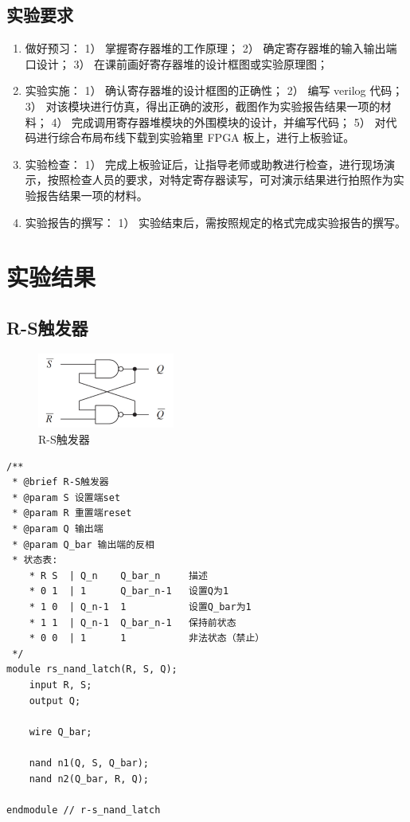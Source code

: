 \documentclass[AutoFakeBold]{LZUThesis}
\begin{document}
\section{实验要求}
\begin{enumerate}
    \item 做好预习：
    1） 掌握寄存器堆的工作原理；
    2） 确定寄存器堆的输入输出端口设计；
    3） 在课前画好寄存器堆的设计框图或实验原理图；
    \item 实验实施：
    1） 确认寄存器堆的设计框图的正确性；
    2） 编写 verilog 代码；
    3） 对该模块进行仿真，得出正确的波形，截图作为实验报告结果一项的材料；
    4） 完成调用寄存器堆模块的外围模块的设计，并编写代码；
    5） 对代码进行综合布局布线下载到实验箱里 FPGA 板上，进行上板验证。
    \item 实验检查：
    1） 完成上板验证后，让指导老师或助教进行检查，进行现场演示，按照检查人员的要求，对特定寄存器读写，可对演示结果进行拍照作为实验报告结果一项的材料。
    \item 实验报告的撰写：
    1） 实验结束后，需按照规定的格式完成实验报告的撰写。
\end{enumerate}

\chapter{实验结果}
\section{R-S触发器}
\begin{figure}[htbp]
    \centering
    \includegraphics[width=0.4\textwidth]{img/RS_latch}
    \caption{R-S触发器}
\end{figure}

\begin{lstlisting}[style={verilog-style}]
/**
 * @brief R-S触发器
 * @param S 设置端set
 * @param R 重置端reset
 * @param Q 输出端
 * @param Q_bar 输出端的反相
 * 状态表:
    * R	S  | Q_n	Q_bar_n	    描述
    * 0	1  | 1	    Q_bar_n-1	设置Q为1
    * 1	0  | Q_n-1	1	        设置Q_bar为1
    * 1	1  | Q_n-1	Q_bar_n-1	保持前状态
    * 0	0  | 1	    1	        非法状态（禁止）
 */
module rs_nand_latch(R, S, Q);
    input R, S;
    output Q;

    wire Q_bar;

    nand n1(Q, S, Q_bar);
    nand n2(Q_bar, R, Q);

endmodule // r-s_nand_latch
\end{lstlisting}
\end{document}
